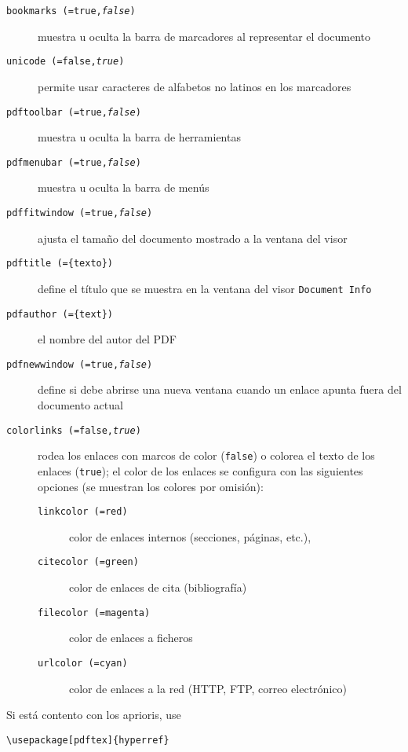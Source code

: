 \begin{flushleft}
\begin{description}
  \item [\texttt{bookmarks (=true,\textit{false})}] muestra u oculta
    la barra de marcadores al representar el documento
  \item [\texttt{unicode (=false,\textit{true})}] permite usar
    caracteres de alfabetos no latinos en los marcadores
  \item [\texttt{pdftoolbar (=true,\textit{false})}] muestra u oculta
    la barra de herramientas
  \item [\texttt{pdfmenubar (=true,\textit{false})}] muestra u oculta
    la barra de menús
  \item [\texttt{pdffitwindow (=true,\textit{false})}] ajusta el
    tamaño del documento mostrado a la ventana del visor
  \item [\texttt{pdftitle (=\{texto\})}] define el título que se
    muestra en la ventana del visor \texttt{Document Info}
  \item [\texttt{pdfauthor (=\{text\})}] el nombre del autor del PDF
  \item [\texttt{pdfnewwindow (=true,\textit{false})}] define si debe
    abrirse una nueva ventana cuando un enlace apunta fuera del
    documento actual
  \item [\texttt{colorlinks (=false,\textit{true})}] rodea los enlaces
    con marcos de color (\texttt{false}) o colorea el texto de los
    enlaces
    (\texttt{true}); el color de los enlaces se configura con las
    siguientes opciones (se muestran los colores por omisión):
    \begin{description}
    \item [\texttt{linkcolor (=red)}] color de enlaces internos
       (secciones, páginas, etc.),
    \item [\texttt{citecolor (=green)}] color de
      enlaces de cita (bibliografía)
    \item [\texttt{filecolor (=magenta)}] color de enlaces a ficheros
    \item [\texttt{urlcolor (=cyan)}] color de enlaces a la red (HTTP,
      FTP, correo electrónico)
    \end{description}
\end{description}
\end{flushleft}

Si está contento con los aprioris, use
\begin{code}
\begin{verbatim}
\usepackage[pdftex]{hyperref}
\end{verbatim}
\end{code}

